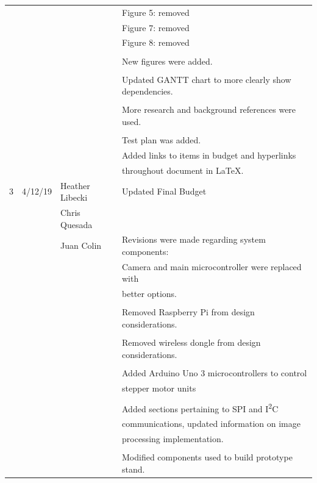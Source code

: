 \begin{table} [H]
\begin{tabular}{|l|l|l|l|}
	      &          		 &                			   & Figure 5: removed\\
	      &			 &				   & Figure 7: removed\\
	      &			 &				   & Figure 8: removed\\
	      &			 &				   &	\\
	      &			 & 				   & New figures were added.\\
	      &			 &				   &	\\
	      &			 &				   & Updated GANTT chart to more clearly show dependencies.\\
	      &			 &				   &	\\
	      &			 &				   & More research and background references were used.\\
	      &			 &				   &	\\
	      &			 &				   & Test plan was added.\\
 	      &			 &				   & Added links to items in budget and hyperlinks \\
 	      &          		 &                 			   & throughout document in LaTeX.\\
 	     	 \hline
 	   3 & 4/12/19  	 & Heather Libecki & Updated Final Budget \\ 
 	      &          		 & Chris Quesada  	 	   & 	\\
 	      &			 & Juan Colin     		   & Revisions were made regarding system components: \\ 
 	      &			 &                 			   & Camera and main microcontroller were replaced with \\
 	      &			 &				   & better options. 	\\
 	      &          		 &               			   & 	\\
 	      &          		 &              			   & Removed Raspberry Pi from design considerations. \\
 	      &         		 &               			   & 	\\
 	      &         		 &             			   & Removed wireless dongle from design considerations. \\
 	      &        		 &              			   & \\
 	      &         		 &            		              & Added Arduino Uno 3 microcontrollers to control \\
 	      &        		 &                			   & stepper motor units \\
 	      &         		 &              			   & \\
 	      &         		 &               			   & Added sections pertaining to SPI and I\textsuperscript{2}C \\
 	      &         		 &              			   & communications, updated information on image \\
 	      &        		 &                 			   &  processing implementation. \\
 	      &         		 &               			   & \\
 	      &         		 &              			   & Modified components used to build prototype stand. \\
		\hline
\end{tabular} 
\end{table} 	      
